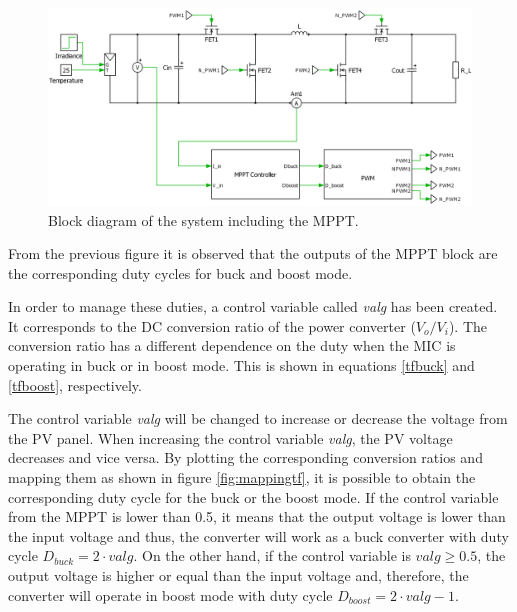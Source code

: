 \begin{figure}[H]
	\begin{center}
		\includegraphics[width=1\textwidth]{../Pictures/BD_implementation_POalgorithm}
		\caption{Block diagram of the system including the MPPT.}
		\label{BD_POalgorithm}
	\end{center}	
\end{figure}

From the previous figure it is observed that the outputs of the MPPT block are the corresponding duty cycles for buck and boost mode. 

In order to manage these duties, a control variable called \textit{valg} has been created. It corresponds to the DC conversion ratio of the power converter ($V_{o}/V_{i}$). The conversion ratio has a different dependence on the duty when the MIC is operating in buck or in boost mode. This is shown in equations \ref{tfbuck} and \ref{tfboost}, respectively. 

The control variable \textit{valg} will be changed to increase or decrease the voltage from the PV panel. When increasing the control variable \textit{valg}, the PV voltage decreases and vice versa.
By plotting the corresponding conversion ratios and mapping them as shown in figure \ref{fig:mappingtf}, it is possible to obtain the corresponding duty cycle for the buck or the boost mode. If the control variable from the MPPT is lower than 0.5, it  means that the output voltage is lower than the input voltage and thus, the converter will work as a buck converter with duty cycle $D_{buck}=2 \cdot valg$. On the other hand, if the control variable is $valg \geq 0.5$, the output voltage is higher or equal than the input voltage and, therefore, the converter will operate in boost mode with duty cycle $D_{boost}=2\cdot valg - 1$. %

